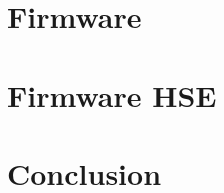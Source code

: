 \section{Firmware}
\label{sec:usecase:firmware}

\section{Firmware HSE}
\label{sec:usecase:hse}

\section{Conclusion}
\label{sec:usecase:conclusion}
